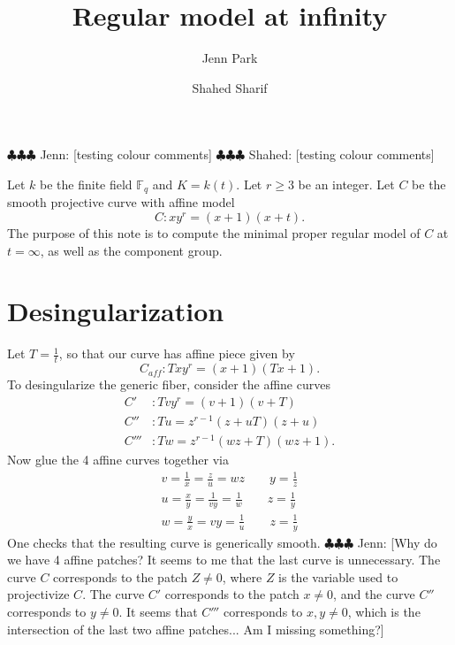 \documentclass{article}
\newcommand{\jenn}[1]{{\color{magenta} \sf $\clubsuit\clubsuit\clubsuit$ Jenn: [#1]}}
\newcommand{\shahed}[1]{{\color{Purple} \sf $\clubsuit\clubsuit\clubsuit$ Shahed: [#1]}}
\theoremstyle{plain}
\theoremstyle{definition}
\theoremstyle{remark}
\newcommand{\F}{\ensuremath{\mathbb{F}}}
\begin{document}
\title{Regular model at infinity}
\author{Jenn Park \and Shahed Sharif}
\maketitle

\jenn{testing colour comments}
\shahed{testing colour comments}

Let $k$ be the finite field $\F_q$ and $K = k(t)$. Let $r \geq 3$ be an integer. Let $C$ be the smooth projective curve with affine model
\[
C: xy^r = (x+1)(x+t).
\]
The purpose of this note is to compute the minimal proper regular model of $C$ at $t = \infty$, as well as the component group.

\section{Desingularization}
\label{sec:desingularization}

Let $T = \frac{1}{t}$, so that our curve has affine piece given by
\[
C_{aff}:Txy^r = (x+1)(Tx+1).
\]
To desingularize the generic fiber, consider the affine curves
\begin{align*}
  C'&: Tvy^r = (v+1)(v+T) \\
  C''&: Tu = z^{r-1}(z+uT)(z+u) \\
  C'''&: Tw = z^{r-1}(wz+T)(wz+1).
\end{align*}
Now glue the 4 affine curves together via
\begin{gather*}
  v = \frac{1}{x} = \frac{z}{u} = wz \qquad y = \frac{1}{z} \\
  u = \frac{x}{y} = \frac{1}{vy} = \frac{1}{w} \qquad z = \frac{1}{y}\\
  w = \frac{y}{x} = vy = \frac{1}{u} \qquad z = \frac{1}{y}
\end{gather*}
One checks that the resulting curve is generically smooth.
\jenn{Why do we have 4 affine patches? It seems to me that the last curve is unnecessary. The curve $C$ corresponds to the patch $Z \neq 0$, where $Z$ is the variable used to projectivize $C$. The curve $C'$ corresponds to the patch $x \neq 0$, and the curve $C''$ corresponds to $y \neq 0$. It seems that $C'''$ corresponds to $x,y \neq 0$, which is the intersection of the last two affine patches... Am I missing something?}
\end{document}
